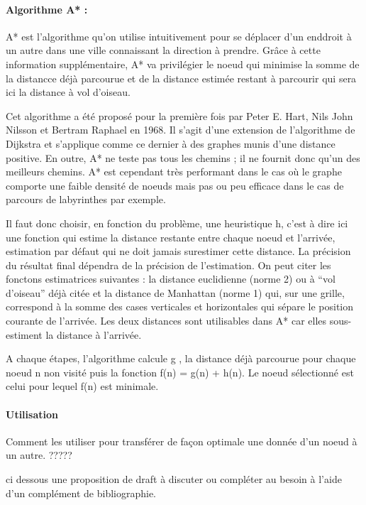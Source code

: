 \paragraph{Algorithme A* : }

A* est l'algorithme qu'on utilise intuitivement pour se déplacer d'un enddroit à un autre dans une ville
connaissant la direction à prendre. Grâce à cette information supplémentaire, A* va privilégier le noeud qui minimise 
la somme de la distancce déjà parcourue et de la distance estimée restant à parcourir qui sera ici la distance à vol d'oiseau.


Cet algorithme a été proposé pour la première fois 
par Peter E. Hart, Nils John Nilsson et Bertram Raphael
en 1968. Il s'agit d'une extension de l'algorithme de Dijkstra et s'applique comme ce dernier
à des graphes munis d'une distance positive. En outre, A* ne teste pas tous les chemins ; il ne fournit donc
qu'un des meilleurs chemins. A* est cependant très performant dans le cas où le graphe comporte une faible densité de noeuds 
mais pas ou peu efficace dans le cas de parcours de labyrinthes par exemple.


Il faut donc choisir, en fonction du problème, une heuristique h, c'est à dire ici une fonction qui estime la distance 
restante entre chaque noeud et l'arrivée, estimation par défaut qui ne doit jamais surestimer cette distance. 
La précision du résultat final dépendra de la précision de l'estimation.
On peut citer les fonctons estimatrices suivantes :  la distance euclidienne (norme 2) ou à ``vol d'oiseau'' déjà citée 
et la distance de Manhattan (norme 1) qui, sur une grille, correspond à la somme des cases verticales et horizontales
qui sépare le position courante de l'arrivée. Les deux distances sont utilisables dans A* car elles sous-estiment
la distance à l'arrivée.


A chaque étapes, l'algorithme calcule g , la distance déjà parcourue pour chaque noeud n non visité puis
la fonction f(n) = g(n) + h(n). Le noeud sélectionné est celui pour lequel f(n) est minimale.




\paragraph{Utilisation}

Comment les utiliser pour transférer de façon optimale une donnée d'un noeud à un autre. ?????

ci dessous une proposition de draft à discuter ou compléter au besoin
à l'aide d'un complément de bibliographie.


